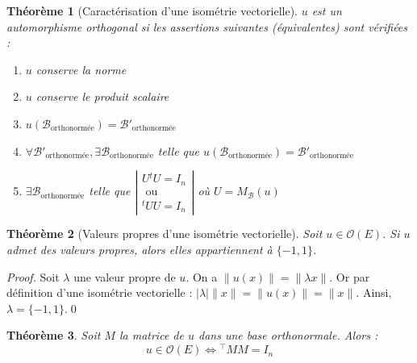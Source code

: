 \documentclass[11pt,a4paper]{report}
\newtheorem{theorem}{Théorème}[chapter]
\newtheorem{itheorem}[theorem]{Théorème}
\theoremstyle{definition}
\begin{document}
\begin{itheorem}[Caractérisation d'une isométrie vectorielle]
    $u$ est un automorphisme orthogonal si les assertions suivantes (équivalentes) sont vérifiées :
    \renewcommand{\theenumi}{\roman{enumi}}%
    \begin{enumerate}
        \item $u$ conserve la norme
        \item $u$ conserve le produit scalaire
        \item $u\left(\mathcal{B}_\text{orthonormée}\right) = \mathcal{B}'_\text{orthonormée}$
        \item $\forall \mathcal{B'}_\text{orthonormée}, \exists \mathcal{B}_\text{orthonormée}$ telle que $u\left(\mathcal{B}_\text{orthonormée}\right) = \mathcal{B}'_\text{orthonormée}$
        \item $\exists \mathcal{B}_\text{orthonormée} $ telle que $\left| \begin{gathered}
            U{}^tU = I_n\\
            \text{ ou }\\
            {}^tUU = I_n
        \end{gathered}\right|$ où $U = M_\mathcal{B}(u)$
    \end{enumerate}
\end{itheorem}
\begin{theorem}[Valeurs propres d'une isométrie vectorielle]
     Soit $u\in \mathcal{O}(E)$. Si $u$ admet des valeurs propres, alors elles appartiennent à $\{ -1 , 1 \}$. 
\end{theorem}
\begin{proof}
     Soit $\lambda$ une valeur propre de $u$. On a $\| u (x) \| = \|\lambda x \|$. Or par définition  d'une isométrie vectorielle : $| \lambda | \| x \| = \| u(x) \| = \| x\|$. Ainsi, $\lambda = \{ -1 , 1\}$.\qed
\end{proof}
\begin{theorem}
     Soit $M$ la matrice de $u$ \emph{dans une base orthonormale}. Alors :
     \begin{equation}
     u \in \mathcal{O}(E) \Longleftrightarrow {}^{\intercal}M M = I_n
     \end{equation}
\end{theorem}
\end{document}
